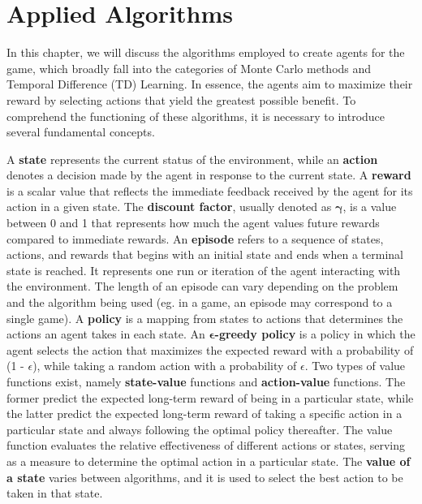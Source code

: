 \chapter{Applied Algorithms}
In this chapter, we will discuss the algorithms employed to create agents for the game, which broadly fall into the categories of Monte Carlo methods and Temporal Difference (TD) Learning. In essence, the agents aim to maximize their reward by selecting actions that yield the greatest possible benefit. To comprehend the functioning of these algorithms, it is necessary to introduce several fundamental concepts. 

A \textbf{state} represents the current status of the environment, while an \textbf{action} denotes a decision made by the agent in response to the current state. A \textbf{reward} is a scalar value that reflects the immediate feedback received by the agent for its action in a given state. The \textbf{discount factor}, usually denoted as $\bm{\gamma}$, is a value between 0 and 1 that represents how much the agent values future rewards compared to immediate rewards. An \textbf{episode} refers to a sequence of states, actions, and rewards that begins with an initial state and ends when a terminal state is reached. It represents one run or iteration of the agent interacting with the environment. The length of an episode can vary depending on the problem and the algorithm being used (eg. in a game, an episode may correspond to a single game). A \textbf{policy} is a mapping from states to actions that determines the actions an agent takes in each state. An \textbf{$\bm{\epsilon}$-greedy policy} is a policy in which the agent selects the action that maximizes the expected reward with a probability of (1 - $\epsilon$), while taking a random action with a probability of $\epsilon$. Two types of value functions exist, namely \textbf{state-value} functions and \textbf{action-value} functions. The former predict the expected long-term reward of being in a particular state, while the latter predict the expected long-term reward of taking a specific action in a particular state and always following the optimal policy thereafter. The value function evaluates the relative effectiveness of different actions or states, serving as a measure to determine the optimal action in a particular state. The \textbf{value of a state} varies between algorithms, and it is used to select the best action to be taken in that state. 

